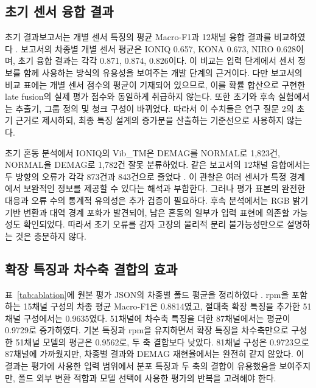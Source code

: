 \documentclass[11pt,a4paper]{article}
\newcommand{\sourceproject}{\citep{project2026}}
\begin{document}
\subsection{초기 센서 융합 결과}
초기 결과보고서는 개별 센서 특징의 평균 Macro-F1과 12채널 융합 결과를 비교하였다 \sourceproject.
보고서의 차종별 개별 센서 평균은 IONIQ 0.657, KONA 0.673, NIRO 0.628이며, 초기 융합 결과는 각각 0.871, 0.874, 0.826이다.
이 비교는 입력 단계에서 센서 정보를 함께 사용하는 방식의 유용성을 보여주는 개발 단계의 근거이다.
다만 보고서의 비교 표에는 개별 센서 점수의 평균이 기재되어 있으므로, 이를 확률 합산으로 구현한 late fusion의 실제 평가 점수와 동일하게 취급하지 않는다.
또한 초기와 후속 실험에서는 추출기, 그룹 정의 및 청크 구성이 바뀌었다.
따라서 이 수치들은 연구 질문 2의 초기 근거로 제시하되, 최종 특징 설계의 증가분을 산출하는 기준선으로 사용하지 않는다.

초기 혼동 분석에서 IONIQ의 Vib\_TM은 DEMAG를 NORMAL로 1,823건, NORMAL을 DEMAG로 1,782건 잘못 분류하였다.
같은 보고서의 12채널 융합에서는 두 방향의 오류가 각각 873건과 843건으로 줄었다 \sourceproject.
이 관찰은 여러 센서가 특정 경계에서 보완적인 정보를 제공할 수 있다는 해석과 부합한다.
그러나 평가 표본의 완전한 대응과 오류 수의 통계적 유의성은 추가 검증이 필요하다.
후속 분석에서는 RGB 밝기 기반 변환과 대역 경계 포화가 발견되어, 남은 혼동의 일부가 입력 표현에 의존할 가능성도 확인되었다.
따라서 초기 오류를 감자 고장의 물리적 분리 불가능성만으로 설명하는 것은 충분하지 않다.

\subsection{확장 특징과 차수축 결합의 효과}
표~\ref{tab:ablation}에 원본 평가 JSON의 차종별 폴드 평균을 정리하였다 \sourceproject.
rpm을 포함하는 15채널 구성의 차종 평균 Macro-F1은 0.8814였고, 절대축 확장 특징을 추가한 51채널 구성에서는 0.9635였다.
51채널에 차수축 특징을 더한 87채널에서는 평균이 0.9729로 증가하였다.
기본 특징과 rpm을 유지하면서 확장 특징을 차수축만으로 구성한 51채널 모델의 평균은 0.9562로, 두 축 결합보다 낮았다.
81채널 구성은 0.9723으로 87채널에 가까웠지만, 차종별 결과와 DEMAG 재현율에서는 완전히 같지 않았다.
이 결과는 평가에 사용한 입력 범위에서 분포 특징과 두 축의 결합이 유용했음을 보여주지만, 폴드 외부 변환 적합과 모델 선택에 사용한 평가의 반복을 고려해야 한다.
\end{document}
